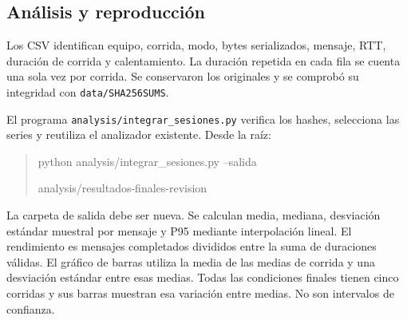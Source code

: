 \subsection{Análisis y reproducción}
Los CSV identifican equipo, corrida, modo, bytes serializados, mensaje,
RTT, duración de corrida y calentamiento. La duración repetida en cada
fila se cuenta una sola vez por corrida. Se conservaron los originales
y se comprobó su integridad con \texttt{data/SHA256SUMS}.

El programa \texttt{analysis/integrar\_sesiones.py} verifica los hashes,
selecciona las series y reutiliza el analizador existente. Desde la raíz:
\begin{quote}\small\ttfamily
python analysis/integrar\_sesiones.py --salida\par
analysis/resultados-finales-revision
\end{quote}
La carpeta de salida debe ser nueva. Se calculan media, mediana,
desviación estándar muestral por mensaje y P95 mediante interpolación
lineal. El rendimiento es mensajes completados divididos entre la suma
de duraciones válidas. El gráfico de barras utiliza la media de las
medias de corrida y una desviación estándar entre esas medias.
Todas las condiciones finales tienen cinco corridas y sus barras
muestran esa variación entre medias. No son intervalos de confianza.
